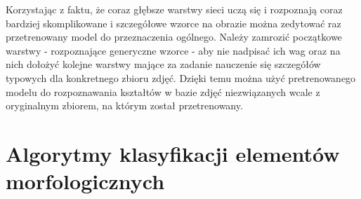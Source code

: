 Korzystając z faktu, że coraz głębsze warstwy sieci uczą się i rozpoznają coraz bardziej skomplikowane i szczegółowe wzorce na obrazie można zedytować raz przetrenowany model do przeznaczenia ogólnego. Należy zamrozić początkowe warstwy - rozpoznające generyczne wzorce - aby nie nadpisać ich wag oraz na nich dołożyć kolejne warstwy mające za zadanie nauczenie się szczegółów typowych dla konkretnego zbioru zdjęć. Dzięki temu można użyć pretrenowanego modelu do rozpoznawania kształtów w bazie zdjęć niezwiązanych wcale z oryginalnym zbiorem, na którym został przetrenowany. 


\section{Algorytmy klasyfikacji elementów morfologicznych}

